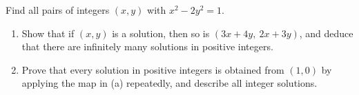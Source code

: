 Find all pairs of integers $(x,y)$ with $x^2-2y^2=1$.
\begin{enumerate}
\item[(a)] Show that if $(x,y)$ is a solution, then so is $(3x+4y,\ 2x+3y)$, and deduce that there are infinitely many solutions in positive integers.
\item[(b)] Prove that every solution in positive integers is obtained from $(1,0)$ by applying the map in (a) repeatedly, and describe all integer solutions.
\end{enumerate}
